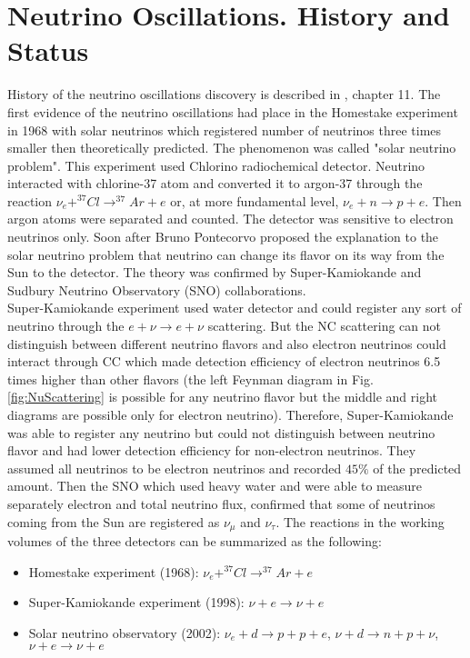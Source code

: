 \section{Neutrino Oscillations. History and Status}

History of the neutrino oscillations discovery is described in \cite{ref_Griffiths}, chapter 11. The first evidence of the neutrino oscillations had place in the Homestake experiment in 1968 with solar neutrinos which registered number of neutrinos three times smaller then theoretically predicted. The phenomenon was called "solar neutrino problem". This experiment used Chlorino radiochemical detector. Neutrino interacted with chlorine-37 atom and converted it to argon-37 through the reaction $\nu_e+^{37}Cl \rightarrow ^{37}Ar+e$ or, at more fundamental level, $\nu_e+n \rightarrow p+e$. Then argon atoms were separated and counted. The detector was sensitive to electron neutrinos only. Soon after Bruno Pontecorvo proposed the explanation to the solar neutrino problem that neutrino can change its flavor on its way from the Sun to the detector. The theory was confirmed  by Super-Kamiokande and Sudbury Neutrino Observatory (SNO) collaborations. \\

Super-Kamiokande experiment used water detector and could register any sort of neutrino through the $e+\nu \rightarrow e+\nu$ scattering. But the NC scattering can not distinguish between different neutrino flavors and also electron neutrinos could interact through CC which made detection efficiency of electron neutrinos 6.5 times higher than other flavors (the left Feynman diagram in Fig. \ref{fig:NuScattering} is possible for any neutrino flavor but the middle and right diagrams are possible only for electron neutrino). Therefore, Super-Kamiokande was able to register any neutrino but could not distinguish between neutrino flavor and had lower detection efficiency for non-electron neutrinos. They assumed all neutrinos to be electron neutrinos and recorded $45\%$ of the predicted amount. Then the SNO which used heavy water and were able to measure separately electron and total neutrino flux, confirmed that some of neutrinos coming from the Sun are registered as $\nu_\mu$ and $\nu_\tau$. The reactions in the working volumes of the three detectors can be summarized as the following:\\
\begin{itemize}
\item Homestake experiment (1968): $\nu_e + ^{37}Cl \rightarrow ^{37}Ar+e$
\item Super-Kamiokande experiment (1998): $\nu + e \rightarrow \nu + e$ 
\item Solar neutrino observatory (2002): $\nu_e + d \rightarrow p+p+e$, $\nu+d \rightarrow n+p+\nu$, $\nu+e \rightarrow \nu+e$
\end{itemize}

